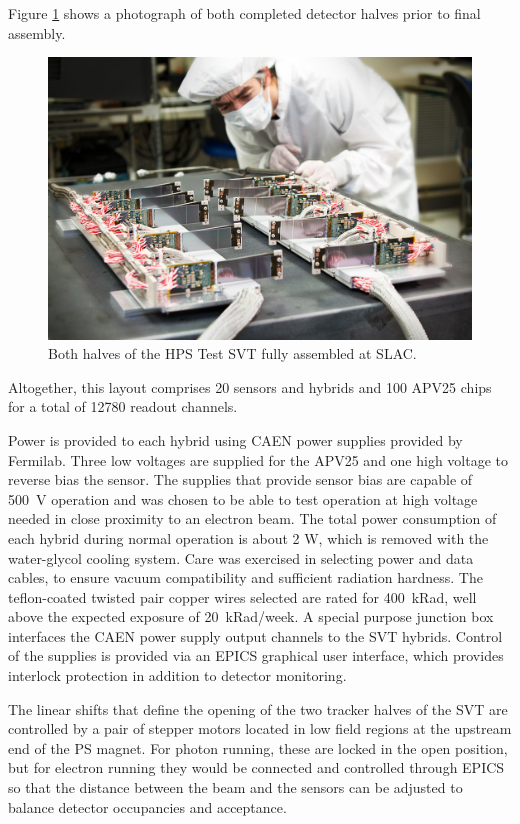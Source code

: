 Figure \ref{fig:tracker_halves} shows a photograph of both completed detector halves prior to final assembly.  
\begin{figure}[ht]
    \includegraphics[width=\textwidth]{test2012/2012-101-PHOTON-DETECTOR-001.jpg}
\caption{\small{Both halves of the HPS Test SVT fully assembled at SLAC.}}
\label{fig:tracker_halves}
\end{figure}
Altogether, this layout comprises 20 sensors and hybrids and 100 APV25 chips for a total of 12780 readout 
channels. 


Power is provided to each hybrid using CAEN power supplies provided by Fermilab. Three low voltages are 
supplied for the APV25 and one high voltage to reverse bias the sensor. The supplies that provide sensor 
bias are capable of 500~V operation and was chosen to be able to test 
operation at high voltage needed in close 
proximity to an electron beam. The total power consumption of each hybrid during normal operation is 
about 2 W, which is removed with the water-glycol cooling system. Care was exercised in selecting power 
and data cables, to ensure vacuum compatibility and sufficient radiation hardness. 
The teflon-coated twisted pair 
copper wires selected are rated for 400~kRad, well above the expected exposure of 20~kRad/week. 
A special purpose junction box interfaces the CAEN power supply output channels to the SVT hybrids. 
Control of the supplies is provided via an EPICS graphical user interface, which provides interlock protection 
in addition to detector monitoring.

The linear shifts that define the opening of the two tracker halves of the SVT are controlled by a pair 
of stepper motors located in low field regions at the upstream end of the PS magnet. For photon running, 
these are locked in the open position, but for electron running they would be connected and controlled 
through EPICS so that the distance between the beam and the sensors can be adjusted to balance detector 
occupancies and acceptance.


